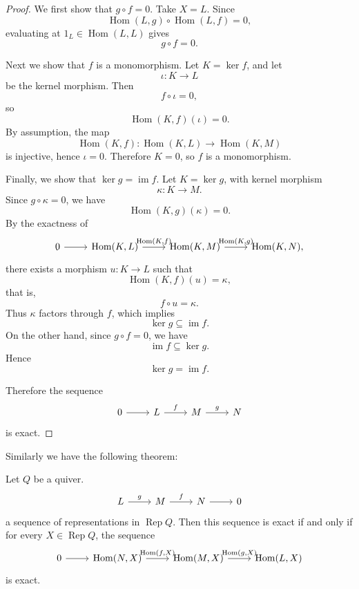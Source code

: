 \documentclass[11pt, a4paper]{report}
\begin{document}
\begin{proof}
    We first show that $g\circ f=0$. Take $X=L$. Since
    \[
        \operatorname{Hom}(L,g)\circ \operatorname{Hom}(L,f)=0,
    \]
    evaluating at $1_L \in \operatorname{Hom}(L,L)$ gives
    \[
        g\circ f=0.
    \]

    Next we show that $f$ is a monomorphism. Let $K=\ker f$, and let
    \[
        \iota:K\to L
    \]
    be the kernel morphism. Then
    \[
        f\circ \iota=0,
    \]
    so
    \[
        \operatorname{Hom}(K,f)(\iota)=0.
    \]
    By assumption, the map
    \[
        \operatorname{Hom}(K,f):\operatorname{Hom}(K,L)\to \operatorname{Hom}(K,M)
    \]
    is injective, hence $\iota=0$. Therefore $K=0$, so $f$ is a monomorphism.

    Finally, we show that $\ker g=\operatorname{im}f$. Let $K=\ker g$, with kernel morphism
    \[
        \kappa:K\to M.
    \]
    Since $g\circ \kappa=0$, we have
    \[
        \operatorname{Hom}(K,g)(\kappa)=0.
    \]
    By the exactness of
    \[
        \begin{tikzcd}
            0 \arrow[r] & {\operatorname{Hom}(K,L)} \arrow[r,"{\operatorname{Hom}(K,f)}"] &
            {\operatorname{Hom}(K,M)} \arrow[r,"{\operatorname{Hom}(K,g)}"] &
            {\operatorname{Hom}(K,N)},
        \end{tikzcd}
    \]
    there exists a morphism $u:K\to L$ such that
    \[
        \operatorname{Hom}(K,f)(u)=\kappa,
    \]
    that is,
    \[
        f\circ u=\kappa.
    \]
    Thus $\kappa$ factors through $f$, which implies
    \[
        \ker g \subseteq \operatorname{im}f.
    \]
    On the other hand, since $g\circ f=0$, we have
    \[
        \operatorname{im}f \subseteq \ker g.
    \]
    Hence
    \[
        \ker g=\operatorname{im}f.
    \]

    Therefore the sequence
    \[
        \begin{tikzcd}
            0 \arrow[r] & L \arrow[r,"f"] & M \arrow[r,"g"] & N
        \end{tikzcd}
    \]
    is exact.
\end{proof}

Similarly we have the following theorem:
\begin{theorem}
    Let $Q$ be a quiver.
    \[
        \begin{tikzcd}
            L \arrow[r,"g"] & M \arrow[r, "f"] & N \arrow[r] & 0
        \end{tikzcd}
    \]
    a sequence of representations in $\operatorname{Rep}Q$. Then this sequence is exact if and only if for every $X \in \operatorname{Rep}Q$, the sequence
    \[
        \begin{tikzcd}
            0 \arrow[r] & {\operatorname{Hom}(N,X)} \arrow[r, "{\operatorname{Hom}(f,X)}"] & {\operatorname{Hom}(M,X)} \arrow[r, "{\operatorname{Hom}(g,X)}"] & {\operatorname{Hom}(L,X)}
        \end{tikzcd}
    \]
    is exact.
\end{theorem}
\end{document}
